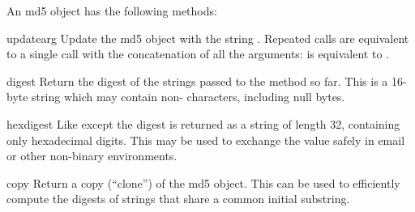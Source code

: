 An md5 object has the following methods:

\begin{methoddesc}[md5]{update}{arg}
Update the md5 object with the string .  Repeated calls are
equivalent to a single call with the concatenation of all the
arguments:  is equivalent to
.
\end{methoddesc}

\begin{methoddesc}[md5]{digest}{}
Return the digest of the strings passed to the 
method so far.  This is a 16-byte string which may contain
non-\ASCII{} characters, including null bytes.
\end{methoddesc}

\begin{methoddesc}[md5]{hexdigest}{}
Like  except the digest is returned as a string of
length 32, containing only hexadecimal digits.  This may 
be used to exchange the value safely in email or other non-binary
environments.
\end{methoddesc}

\begin{methoddesc}[md5]{copy}{}
Return a copy (``clone'') of the md5 object.  This can be used to
efficiently compute the digests of strings that share a common initial
substring.
\end{methoddesc}


\begin{seealso}
\end{seealso}
